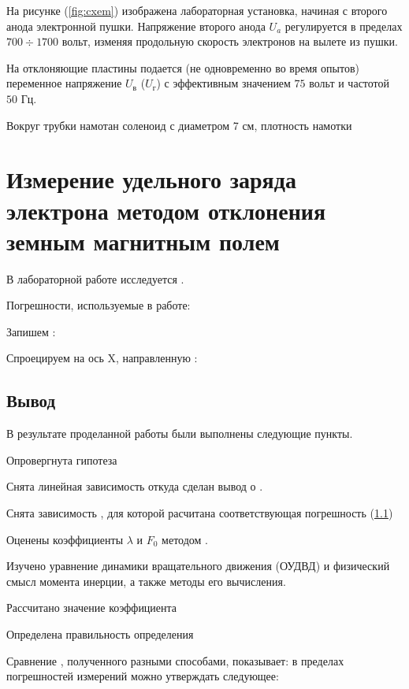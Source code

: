 На рисунке (\ref{fig:cxem}) изображена лабораторная установка, начиная с второго анода электронной пушки. Напряжение второго анода $U_a$ регулируется в пределах $700\div1700$ вольт, изменяя продольную скорость электронов на вылете из пушки.

На отклоняющие пластины подается (не одновременно во время опытов) переменное напряжение $U_\text{в}$ ($U_\text{г}$) с эффективным значением $75$ вольт и частотой $50$ Гц. 

Вокруг трубки намотан соленоид с диаметром 7 см, плотность намотки 



\section{Измерение удельного заряда электрона методом отклонения земным магнитным полем}

В лабораторной работе исследуется .

Погрешности, используемые в работе: 

Запишем :
\begin{EqSystem}
\end{EqSystem}

Спроецируем на ось X, направленную :
\begin{EqSystem}
	\label{eq:}
\end{EqSystem}

\subsection{Вывод}

В результате проделанной работы были выполнены следующие пункты.

Опровергнута гипотеза 

Снята линейная зависимость  откуда сделан вывод о .

Снята зависимость ,
для которой расчитана соответствующая погрешность (\ref{})

Оценены коэффициенты $\lambda$  и $F_0$ методом .

Изучено уравнение динамики вращательного движения (ОУДВД) и физический смысл момента инерции, а также методы его вычисления.

Рассчитано значение коэффициента 

Определена правильность определения

Сравнение , полученного разными способами, показывает: в пределах погрешностей измерений можно утверждать следующее: 


